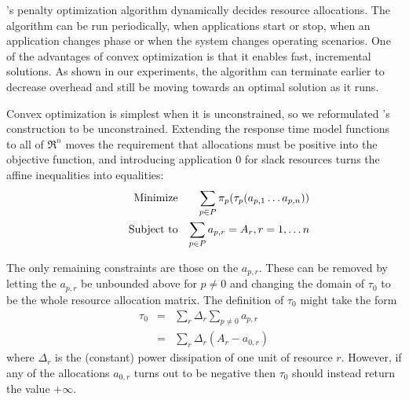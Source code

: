 
\pacora's penalty optimization algorithm dynamically decides resource allocations. The algorithm can be run periodically, when applications start or stop, when an application changes phase or when the system changes operating scenarios.  One of the advantages of convex optimization is that it enables fast, incremental solutions.  As shown in our experiments, the algorithm can terminate earlier to decrease overhead and still be moving towards an optimal solution as it runs.  %

Convex optimization is simplest when it is unconstrained, so we reformulated \pacora's construction to be unconstrained.
Extending the response time model functions to all of $\Re^n$
moves the requirement that allocations must be positive into the objective function,
and introducing application 0 for slack resources turns the affine inequalities into equalities:
\begin{eqnarray*}
& \makebox[1in][r]{Minimize}   & \sum_{p\in P} {\pi_p(\tau_p(a_{p,1}\ldots a_{p,n}))}  \\
& \makebox[1in][r]{Subject to} & \sum_{p\in P} a_{p,r} = A_r, r = 1,\ldots n           \\
\end{eqnarray*}

The only remaining constraints are those on the $a_{p,r}$.
These can be removed by letting the $a_{p,r}$ be unbounded above for $p \neq 0$
and changing the domain of $\tau_0$  to be the whole resource allocation matrix.
The definition of $\tau_0$ might take the form
\begin{eqnarray*}
\tau_0 &=& \sum_r \Delta_r \sum_{p \neq 0} a_{p,r}     \\
       &=& \sum_r \Delta_r (A_r - a_{0,r})
\end{eqnarray*}
where $\Delta_r$ is the (constant) power dissipation of one unit of resource $r$.
However, if any of the allocations $a_{0,r}$ turns out to be negative then $\tau_0$  should instead return the value $+\infty$.

